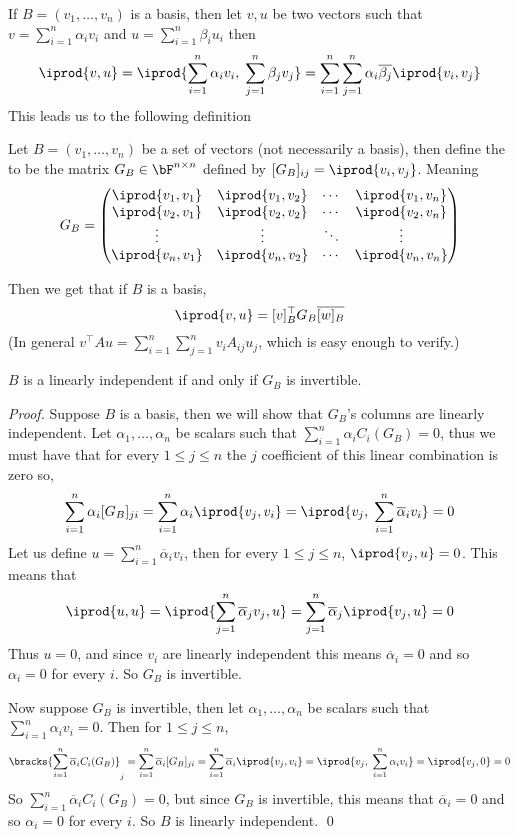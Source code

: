 If $B=(v_1,\dots,v_n)$ is a basis, then let $v,u$ be two vectors such that $v=\sum_{i=1}^n\alpha_iv_i$ and $u=\sum_{i=1}^n\beta_iu_i$ then
\[ \iprod{v,u} = \iprod{\sum_{i=1}^n\alpha_iv_i,\;\sum_{j=1}^n\beta_jv_j} = \sum_{i=1}^n\sum_{j=1}^n\alpha_i\overline{\beta_j}\iprod{v_i,v_j} \]
This leads us to the following definition

\begin{defn*}

    Let $B=(v_1,\dots,v_n)$ be a set of vectors (not necessarily a basis), then define the  to be the matrix $G_B\in\bF^{n\times n}$ defined by $[G_B]_{ij}=\iprod{v_i,v_j}$.
    Meaning
    \[ G_B = \pmat{
        \iprod{v_1,v_1} & \iprod{v_1,v_2} & \cdots & \iprod{v_1,v_n}\cr
        \iprod{v_2,v_1} & \iprod{v_2,v_2} & \cdots & \iprod{v_2,v_n}\cr
        \vdots & \vdots & \ddots & \vdots\cr
        \iprod{v_n,v_1} & \iprod{v_n,v_2} & \cdots & \iprod{v_n,v_n}
    } \]

\end{defn*}

Then we get that if $B$ is a basis,
\[ \iprod{v,u} = [v]^\top_BG_B\overline{[w]_B} \]
(In general $v^\top Au=\sum_{i=1}^n\sum_{j=1}^nv_iA_{ij}u_j$, which is easy enough to verify.)

\begin{thrm*}

    $B$ is a linearly independent if and only if $G_B$ is invertible.

\end{thrm*}

\begin{proof}

    Suppose $B$ is a basis, then we will show that $G_B$'s columns are linearly independent.
    Let $\alpha_1,\dots,\alpha_n$ be scalars such that $\sum_{i=1}^n\alpha_iC_i(G_B)=0$, thus we must have that for every $1\leq j\leq n$ the $j$ coefficient of this linear combination is zero so,
    \[ \sum_{i=1}^n\alpha_i[G_B]_{ji} = \sum_{i=1}^n\alpha_i\iprod{v_j,v_i} = \iprod{v_j,\;\sum_{i=1}^n\overline\alpha_iv_i} = 0 \]
    Let us define $u=\sum_{i=1}^n\overline\alpha_iv_i$, then for every $1\leq j\leq n$, $\iprod{v_j,u}=0$.
    This means that
    \[ \iprod{u,u} = \iprod{\sum_{j=1}^n\overline\alpha_jv_j,u} = \sum_{j=1}^n\overline\alpha_j\iprod{v_j,u} = 0 \]
    Thus $u=0$, and since $v_i$ are linearly independent this means $\overline\alpha_i=0$ and so $\alpha_i=0$ for every $i$.
    So $G_B$ is invertible.

    Now suppose $G_B$ is invertible, then let $\alpha_1,\dots,\alpha_n$ be scalars such that $\sum_{i=1}^n\alpha_iv_i=0$.
    Then for $1\leq j\leq n$,
    \[ \bracks{\sum_{i=1}^n\overline\alpha_iC_i(G_B)}_j = \sum_{i=1}^n\overline\alpha_i[G_B]_{ji} = \sum_{i=1}^n\overline\alpha_i\iprod{v_j,v_i} = \iprod{v_j,\;\sum_{i=1}^n\alpha_iv_i} = \iprod{v_j,0} = 0 \]
    So $\sum_{i=1}^n\overline\alpha_iC_i(G_B)=0$, but since $G_B$ is invertible, this means that $\overline\alpha_i=0$ and so $\alpha_i=0$ for every $i$.
    So $B$ is linearly independent.
    \qed

\end{proof}

